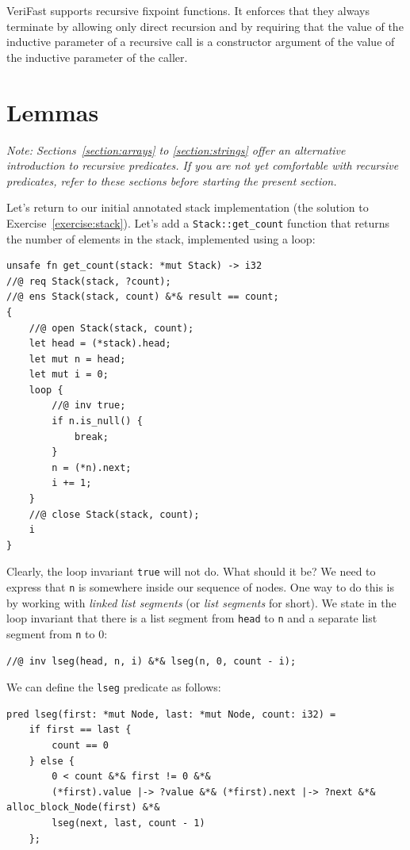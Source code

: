 \documentclass{article}
\begin{document}
VeriFast supports recursive fixpoint functions. It enforces
that they always terminate by allowing only direct recursion
and by requiring that the value of the inductive parameter of a
recursive call is a constructor argument of the value of the
inductive parameter of the caller.

\section{Lemmas}\label{section:lemmas}

\emph{Note: Sections~\ref{section:arrays} to
\ref{section:strings} offer an alternative introduction to
recursive predicates. If you are not yet comfortable with
recursive predicates, refer to these sections before starting
the present section.}

Let's return to our initial annotated stack implementation (the
solution to Exercise~\ref{exercise:stack}). Let's add a
\lstinline!Stack::get_count! function that returns the number of
elements in the stack, implemented using a loop:
\begin{lstlisting}
unsafe fn get_count(stack: *mut Stack) -> i32
//@ req Stack(stack, ?count);
//@ ens Stack(stack, count) &*& result == count;
{
    //@ open Stack(stack, count);
    let head = (*stack).head;
    let mut n = head;
    let mut i = 0;
    loop {
        //@ inv true;
        if n.is_null() {
            break;
        }
        n = (*n).next;
        i += 1;
    }
    //@ close Stack(stack, count);
    i
}
\end{lstlisting}
Clearly, the loop invariant \lstinline!true! will not do. What
should it be? We need to express that \lstinline!n! is
somewhere inside our sequence of nodes. One way to do this is
by working with \emph{linked list segments} (or \emph{list
segments} for short). We state in the loop invariant that there
is a list segment from \lstinline!head! to \lstinline!n! and a
separate list segment from \lstinline!n! to 0:
\begin{lstlisting}
//@ inv lseg(head, n, i) &*& lseg(n, 0, count - i);
\end{lstlisting}
We can define the \lstinline!lseg! predicate as follows:
\begin{lstlisting}
pred lseg(first: *mut Node, last: *mut Node, count: i32) =
    if first == last {
        count == 0
    } else {
        0 < count &*& first != 0 &*&
        (*first).value |-> ?value &*& (*first).next |-> ?next &*& alloc_block_Node(first) &*&
        lseg(next, last, count - 1)
    };
\end{lstlisting}
\end{document}
